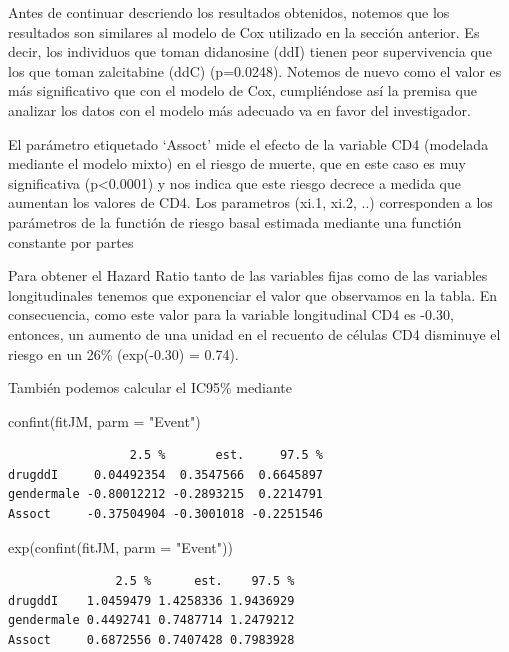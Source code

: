 \documentclass[
]{book}
\newenvironment{Shaded}{\begin{snugshade}}{\end{snugshade}}
\newcommand{\AttributeTok}[1]{\textcolor[rgb]{0.77,0.63,0.00}{#1}}
\newcommand{\FunctionTok}[1]{\textcolor[rgb]{0.00,0.00,0.00}{#1}}
\newcommand{\NormalTok}[1]{#1}
\newcommand{\StringTok}[1]{\textcolor[rgb]{0.31,0.60,0.02}{#1}}
\begin{document}
Antes de continuar descriendo los resultados obtenidos, notemos que los resultados son similares al modelo de Cox utilizado en la sección anterior. Es decir, los individuos que toman didanosine (ddI) tienen peor supervivencia que los que toman zalcitabine (ddC) (p=0.0248). Notemos de nuevo como el valor es más significativo que con el modelo de Cox, cumpliéndose así la premisa que analizar los datos con el modelo más adecuado va en favor del investigador.

El parámetro etiquetado `Assoct' mide el efecto de la variable CD4 (modelada mediante el modelo mixto) en el riesgo de muerte, que en este caso es muy significativa (p\textless0.0001) y nos indica que este riesgo decrece a medida que aumentan los valores de CD4. Los parametros (xi.1, xi.2, ..) corresponden a los parámetros de la functión de riesgo basal estimada mediante una functión constante por partes

Para obtener el Hazard Ratio tanto de las variables fijas como de las variables longitudinales tenemos que exponenciar el valor que observamos en la tabla. En consecuencia, como este valor para la variable longitudinal CD4 es -0.30, entonces, un aumento de una unidad en el recuento de células CD4 disminuye el riesgo en un 26\% (exp(-0.30) = 0.74).

También podemos calcular el IC95\% mediante

\begin{Shaded}
\begin{Highlighting}[]
\FunctionTok{confint}\NormalTok{(fitJM, }\AttributeTok{parm =} \StringTok{"Event"}\NormalTok{)}
\end{Highlighting}
\end{Shaded}

\begin{verbatim}
                 2.5 %       est.     97.5 %
drugddI     0.04492354  0.3547566  0.6645897
gendermale -0.80012212 -0.2893215  0.2214791
Assoct     -0.37504904 -0.3001018 -0.2251546
\end{verbatim}

\begin{Shaded}
\begin{Highlighting}[]
\FunctionTok{exp}\NormalTok{(}\FunctionTok{confint}\NormalTok{(fitJM, }\AttributeTok{parm =} \StringTok{"Event"}\NormalTok{))}
\end{Highlighting}
\end{Shaded}

\begin{verbatim}
               2.5 %      est.    97.5 %
drugddI    1.0459479 1.4258336 1.9436929
gendermale 0.4492741 0.7487714 1.2479212
Assoct     0.6872556 0.7407428 0.7983928
\end{verbatim}
\end{document}
